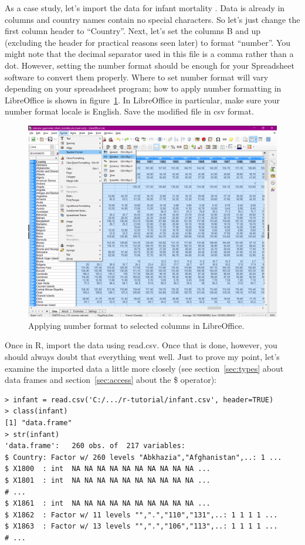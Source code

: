 \documentclass{report}
\newcommand{\code}[1]{\textsf{\ttfamily #1}}
\begin{document}
		As a case study, let's import the data for infant mortality \cite{gapminder}. Data is already in columns and country names contain no special characters. So let's just change the first column header to ``Country''. Next, let's set the columns B and up (excluding the header for practical reasons seen later) to format ``number''. You might note that the decimal separator used in this file is a comma rather than a dot. However, setting the number format should be enough for your Spreadsheet software to convert them properly. Where to set number format will vary depending on your spreadsheet program; how to apply number formatting in LibreOffice is shown in figure~\ref{fig:format}. In LibreOffice in particular, make sure your number format locale is English. Save the modified file in csv format.
		\begin{figure}[h]
			\centering
			\includegraphics[width=1.0\textwidth]{format.png}
			\caption{Applying number format to selected columns in LibreOffice.}
			\label{fig:format}
		\end{figure}
	
		Once in R, import the data using \code{read.csv}. Once that is done, however, you should always doubt that everything went well. Just to prove my point, let's examine the imported data a little more closely (see section~\ref{sec:types} about data frames and section~\ref{sec:access} about the \code{\$} operator):
		\begin{verbatim}
> infant = read.csv('C:/.../r-tutorial/infant.csv', header=TRUE)
> class(infant)
[1] "data.frame"
> str(infant)
'data.frame':   260 obs. of  217 variables:
$ Country: Factor w/ 260 levels "Abkhazia","Afghanistan",..: 1 ...
$ X1800  : int  NA NA NA NA NA NA NA NA NA NA ...
$ X1801  : int  NA NA NA NA NA NA NA NA NA NA ...
# ...
$ X1861  : int  NA NA NA NA NA NA NA NA NA NA ...
$ X1862  : Factor w/ 11 levels "",".","110","131",..: 1 1 1 1 ...
$ X1863  : Factor w/ 13 levels "",".","106","113",..: 1 1 1 1 ...
# ... 
		\end{verbatim}
		
\end{document}
